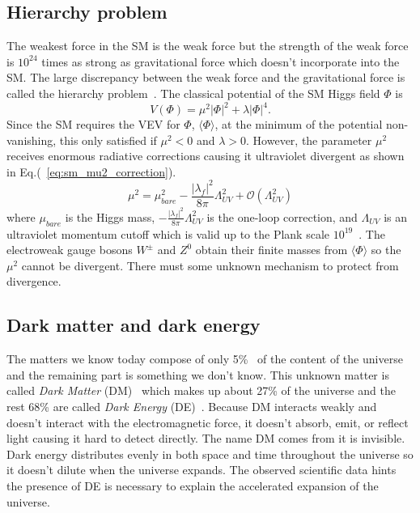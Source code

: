 \subsection{Hierarchy problem}
\label{subsec:sm_hierarchy_problem}
The weakest force in the SM is the weak force but the strength of the weak force is $10^{24}$ times as strong as gravitational force which doesn't incorporate into the SM.
The large discrepancy between the weak force and the gravitational force is called the hierarchy problem~\cite{Martin:1997ns, Chankowski:1998za, maarten_brak}.
The classical potential of the SM Higgs field $\Phi$ is
%
\begin{equation}
    V(\Phi) = \mu^{2} |\Phi|^2 + \lambda |\Phi|^4.
\end{equation}
%
Since the SM requires the VEV for $\Phi$, $\langle \Phi \rangle$, at the minimum of the potential non-vanishing, this only satisfied if $\mu^{2} < 0$ and $\lambda > 0$.
However, the parameter $\mu^{2}$ receives enormous radiative corrections causing it ultraviolet divergent as shown in Eq.(~\ref{eq:sm_mu2_correction}).
%
\begin{equation}
    \mu^{2} = \mu_{bare}^{2} - \frac{|\lambda_{f}|^{2}}{8\pi}\Lambda_{UV}^{2} + \mathcal{O}(\Lambda_{UV}^{2})
    \label{eq:sm_mu2_correction}
\end{equation}
%
where $\mu_{bare}$ is the Higgs mass, $- \frac{|\lambda_{f}|^{2}}{8\pi}\Lambda_{UV}^{2}$ is the one-loop correction, and $\Lambda_{UV}$ is an ultraviolet momentum cutoff which is valid up to the Plank scale $10^{19}$~{\GeV}.
The electroweak gauge bosons $W^{\pm}$ and $Z^{0}$ obtain their finite masses from $\langle \Phi \rangle$ so the $\mu^{2}$ cannot be divergent.
There must some unknown mechanism to protect from divergence.


\subsection{Dark matter and dark energy}
\label{subsec:sm_dm}
The matters we know today compose of only 5\%~\cite{Bennett:2012zja, Ade:2013sjv} of the content of the universe and the remaining part is something we don't know.
This unknown matter is called \textit{Dark Matter} (DM)~\cite{Bertone:2004pz} which makes up about 27\% of the universe and the rest 68\% are called \textit{Dark Energy} (DE)~\cite{Bennett:2012zja, Ade:2013sjv}.
Because DM interacts weakly and doesn't interact with the electromagnetic force, it doesn't absorb, emit, or reflect light causing it hard to detect directly. 
The name DM comes from it is invisible.
Dark energy distributes evenly in both space and time throughout the universe so it doesn't dilute when the universe expands.
The observed scientific data hints the presence of DE is necessary to explain the accelerated expansion of the universe.

